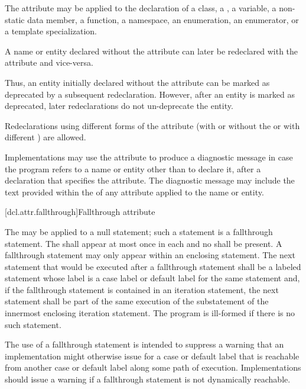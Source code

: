 \pnum
The attribute may be applied to the declaration of
a class,
a ,
a variable,
a non-static data member,
a function,
a namespace,
an enumeration,
an enumerator, or
a template specialization.

\pnum
A name or entity declared without the  attribute can later be redeclared
with the attribute and vice-versa.
\begin{note}
Thus, an entity initially declared without the
attribute can be marked as deprecated by a subsequent redeclaration. However, after an entity
is marked as deprecated, later redeclarations do not un-deprecate the entity.
\end{note}
Redeclarations using different forms of the attribute (with or without the
 or with different
) are allowed.

\pnum
\begin{note}
Implementations may use the  attribute to produce a diagnostic
message in case the program refers to a name or entity other than to declare it, after a
declaration that specifies the attribute. The diagnostic message may include the text provided
within the  of any  attribute applied
to the name or entity.
\end{note}

[dcl.attr.fallthrough]{Fallthrough attribute}

\pnum
The  
may be applied to a null statement;
such a statement is a fallthrough statement.
The  
shall appear at most once in each  and
no  shall be present.
A fallthrough statement may only appear within
an enclosing  statement.
The next statement that would be executed after a fallthrough statement
shall be a labeled statement whose label is a case label or
default label for the same  statement and,
if the fallthrough statement is contained in an iteration statement,
the next statement shall be part of the same execution of
the substatement of the innermost enclosing iteration statement.
The program is ill-formed if there is no such statement.

\pnum
\begin{note}
The use of a fallthrough statement is intended to suppress
a warning that an implementation might otherwise issue
for a case or default label that is reachable
from another case or default label along some path of execution.
Implementations should issue a warning
if a fallthrough statement is not dynamically reachable.
\end{note}

